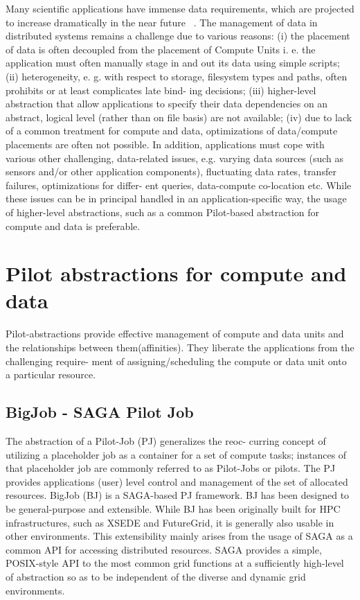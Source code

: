 \documentclass[12pt]{report}
\begin{document}
Many scientific applications have immense data requirements, which are projected to increase dramatically in the near future ~\cite{pstar-32}.  The management of data in distributed systems remains a challenge due to various reasons: (i) the placement of data is often decoupled from the placement of Compute Units i. e. the application must often manually stage in and out its data using simple scripts; (ii) heterogeneity, e. g. with respect to storage, filesystem types and paths, often prohibits or at least complicates late bind- ing decisions; (iii) higher-level abstraction that allow applications to specify their data dependencies on an abstract, logical level (rather than on file basis) are not available; (iv) due to lack of a common treatment for compute and data, optimizations of data/compute placements are often not possible. In addition, applications must cope with various other challenging, data-related issues, e.g. varying data sources (such as sensors and/or other application components), fluctuating data rates, transfer failures, optimizations for differ- ent queries, data-compute co-location etc. While these issues can be in principal handled in an application-specific way, the usage of higher-level abstractions, such as a common Pilot-based abstraction for compute and data is preferable.


\section{Pilot abstractions for compute and data} \label{sec:pa}
Pilot-abstractions provide effective management of compute and data units and the relationships between them(affinities). They liberate the applications from the challenging require- ment of assigning/scheduling the compute or data unit onto a particular resource.

\subsection{BigJob - SAGA Pilot Job} \label{sec:pj}
The abstraction of a Pilot-Job (PJ) generalizes the reoc- curring concept of utilizing a placeholder job as a container for a set of compute tasks; instances of that placeholder job are commonly referred to as Pilot-Jobs or pilots. The PJ provides applications (user) level control and management of the set of allocated resources.
BigJob (BJ) is a SAGA-based PJ framework. BJ has been designed to be general-purpose and extensible. While BJ has been originally built for HPC infrastructures, such as XSEDE and FutureGrid, it is generally also usable in other environments. This extensibility mainly arises from the usage of SAGA as a common API for accessing distributed resources. SAGA provides a simple, POSIX-style API to the most common grid functions at a sufficiently high-level of abstraction so as to be independent of the diverse and dynamic grid environments. ~\cite{bigjob-15}
\end{document}
